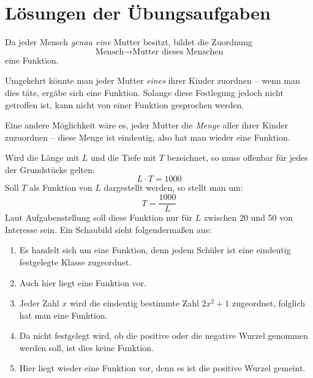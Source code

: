 \chapter{Lösungen der Übungsaufgaben}

Da jeder Mensch \emph{genau eine} Mutter besitzt, bildet die Zuordnung
\[ \text{Mensch} \rightarrow \text{Mutter dieses Menschen} \]
eine Funktion.

Umgekehrt könnte man jeder Mutter \emph{eines} ihrer Kinder zuordnen -- wenn man dies täte, ergäbe sich eine Funktion. Solange diese Festlegung jedoch nicht getroffen ist, kann nicht von einer Funktion gesprochen werden.

Eine andere Möglichkeit wäre es, jeder Mutter die \emph{Menge} aller ihrer Kinder zuzuordnen -- diese Menge ist eindeutig, also hat man wieder eine Funktion.

Wird die Länge mit $L$ und die Tiefe mit $T$ bezeichnet, so muss offenbar für jedes der Grundstücke gelten:
\[ L \cdot T = 1000 \]
Soll $T$ als Funktion von $L$ dargestellt werden, so stellt man um:
\[ T = \frac{1000}{L} \]
Laut Aufgabenstellung soll diese Funktion nur für $L$ zwischen 20 und 50 von Interesse sein.
Ein Schaubild sieht folgendermaßen aus:

\begin{center}
\end{center}

\begin{enumerate}[label=\alph*)]
  \item Es handelt sich um eine Funktion, denn jedem Schüler ist eine eindeutig festgelegte Klasse zugeordnet.
  \item Auch hier liegt eine Funktion vor.
  \item Jeder Zahl $x$ wird die eindeutig bestimmte Zahl $2x^2 + 1$ zugeordnet, folglich hat man eine Funktion.
  \item Da nicht festgelegt wird, ob die positive oder die negative Wurzel genommen werden soll, ist dies keine Funktion.
  \item Hier liegt wieder eine Funktion vor, denn es ist die positive Wurzel gemeint.
\end{enumerate}

